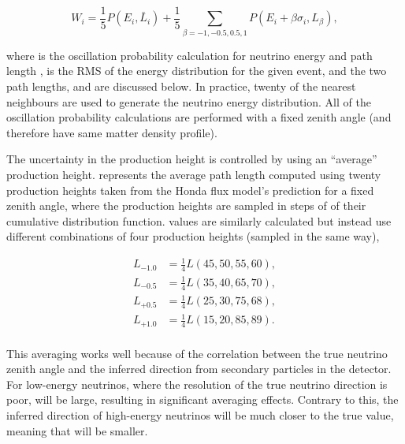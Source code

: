 \begin{equation}
  W_{i} = \frac{1}{5} P(E_{i},\bar{L}_{i}) + \frac{1}{5} \sum_{\beta = -1, -0.5, 0.5, 1} P(E_{i} + \beta\sigma_{i},L_{\beta}),
\end{equation}

where  is the oscillation probability calculation for neutrino energy  and path length ,  is the RMS of the energy distribution for the given event, and the two path lengths,  and  are discussed below. In practice, twenty of the nearest neighbours are used to generate the neutrino energy distribution. All of the oscillation probability calculations are performed with a fixed zenith angle (and therefore have same matter density profile).

The uncertainty in the production height is controlled by using an ``average'' production height.  represents the average path length computed using twenty production heights taken from the Honda flux model's prediction \cite{Honda:2011} for a fixed zenith angle, where the production heights are sampled in steps of  of their cumulative distribution function.  values are similarly calculated but instead use different combinations of four production heights (sampled in the same way),

\begin{equation}
  \begin{split}
    L_{-1.0} &= \frac{1}{4} L(45,50,55,60), \\
    L_{-0.5} &= \frac{1}{4} L(35,40,65,70), \\
    L_{+0.5} &= \frac{1}{4} L(25,30,75,68), \\
    L_{+1.0} &= \frac{1}{4} L(15,20,85,89). \\
  \end{split}
\end{equation}

This averaging works well because of the correlation between the true neutrino zenith angle and the inferred direction from secondary particles in the detector. For low-energy neutrinos, where the resolution of the true neutrino direction is poor,  will be large, resulting in significant averaging effects. Contrary to this, the inferred direction of high-energy neutrinos will be much closer to the true value, meaning that  will be smaller.

